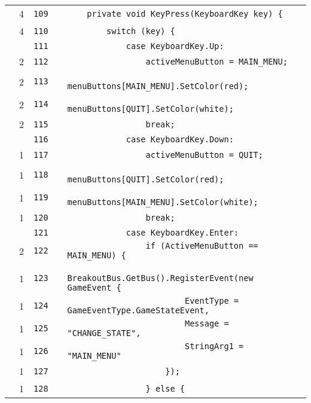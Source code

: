 \documentclass[a4paper,landscape,10pt]{article}
\begin{document}
\begin{longtable}[l]{lrrll}
\cellcolor{green} & 4 & \verb~109~ & & \verb~    private void KeyPress(KeyboardKey key) {~\\
\cellcolor{green} & 4 & \verb~110~ & & \verb~        switch (key) {~\\
\cellcolor{gray} &  & \verb~111~ & & \verb~            case KeyboardKey.Up:~\\
\cellcolor{green} & 2 & \verb~112~ & & \verb~                activeMenuButton = MAIN_MENU;~\\
\cellcolor{green} & 2 & \verb~113~ & & \verb~                menuButtons[MAIN_MENU].SetColor(red);~\\
\cellcolor{green} & 2 & \verb~114~ & & \verb~                menuButtons[QUIT].SetColor(white);~\\
\cellcolor{green} & 2 & \verb~115~ & & \verb~                break;~\\
\cellcolor{gray} &  & \verb~116~ & & \verb~            case KeyboardKey.Down:~\\
\cellcolor{green} & 1 & \verb~117~ & & \verb~                activeMenuButton = QUIT;~\\
\cellcolor{green} & 1 & \verb~118~ & & \verb~                menuButtons[QUIT].SetColor(red);~\\
\cellcolor{green} & 1 & \verb~119~ & & \verb~                menuButtons[MAIN_MENU].SetColor(white);~\\
\cellcolor{green} & 1 & \verb~120~ & & \verb~                break;~\\
\cellcolor{gray} &  & \verb~121~ & & \verb~            case KeyboardKey.Enter:~\\
\cellcolor{orange} & 2 & \verb~122~ & & \verb~                if (ActiveMenuButton == MAIN_MENU) {~\\
\cellcolor{green} & 1 & \verb~123~ & & \verb~                    BreakoutBus.GetBus().RegisterEvent(new GameEvent {~\\
\cellcolor{green} & 1 & \verb~124~ & & \verb~                        EventType = GameEventType.GameStateEvent,~\\
\cellcolor{green} & 1 & \verb~125~ & & \verb~                        Message = "CHANGE_STATE",~\\
\cellcolor{green} & 1 & \verb~126~ & & \verb~                        StringArg1 = "MAIN_MENU"~\\
\cellcolor{green} & 1 & \verb~127~ & & \verb~                    });~\\
\cellcolor{green} & 1 & \verb~128~ & & \verb~                } else {~\\

\end{longtable}
\end{document}
